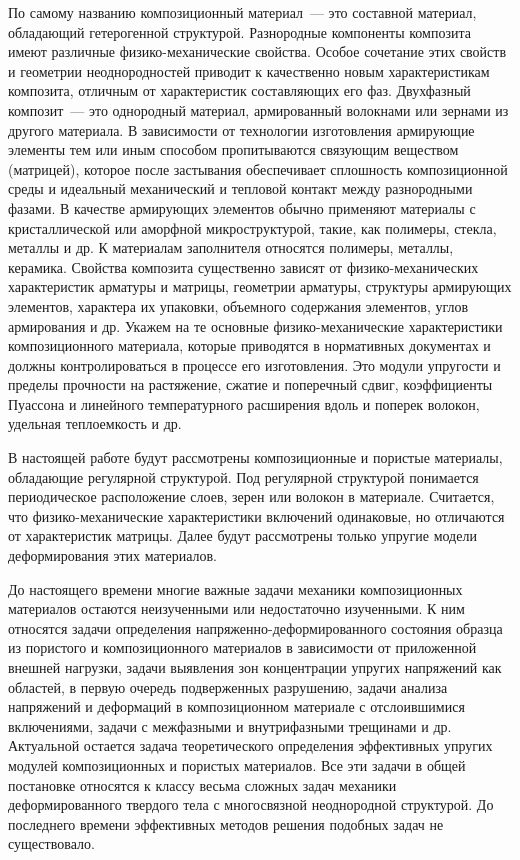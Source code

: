 По самому названию композиционный материал~--- это составной материал, обладающий гетерогенной структурой. Разнородные компоненты композита имеют различные физико-механические свойства. Особое сочетание этих свойств и геометрии неоднородностей приводит к качественно новым характеристикам композита, отличным от характеристик составляющих его фаз. Двухфазный композит~--- это однородный материал, армированный волокнами или зернами из другого материала. В зависимости от технологии изготовления армирующие элементы тем или иным способом пропитываются связующим веществом (матрицей), которое после застывания обеспечивает сплошность композиционной среды и идеальный механический и тепловой контакт между разнородными фазами. В качестве армирующих элементов обычно применяют материалы с кристаллической или аморфной микроструктурой, такие, как полимеры, стекла, металлы и др. К материалам заполнителя относятся полимеры, металлы, керамика. Свойства композита существенно зависят от физико-механических характеристик арматуры и матрицы, геометрии арматуры, структуры армирующих элементов, характера их упаковки, объемного содержания элементов, углов армирования и др. Укажем на те основные физико-механические характеристики композиционного материала, которые приводятся в нормативных документах и должны контролироваться в процессе его изготовления. Это модули упругости и пределы прочности на растяжение, сжатие и поперечный сдвиг, коэффициенты Пуассона и линейного температурного расширения вдоль и поперек волокон, удельная теплоемкость и др.{\sloppy\par}

В настоящей работе будут рассмотрены композиционные и пористые материалы, обладающие регулярной структурой. Под регулярной структурой понимается периодическое расположение слоев, зерен или волокон в материале. Считается, что фи\-зи\-ко-\-ме\-ха\-ни\-че\-ские характеристики включений одинаковые, но отличаются от характеристик матрицы. Далее будут рассмотрены только упругие модели деформирования этих материалов.

До настоящего времени многие важные задачи механики композиционных материалов остаются неизученными или недостаточно изученными. К ним относятся задачи определения напряженно-деформированного состояния образца из пористого и композиционного материалов в зависимости от приложенной внешней нагрузки, задачи выявления зон концентрации упругих напряжений как областей, в первую очередь подверженных разрушению, задачи анализа напряжений и деформаций в композиционном материале с отслоившимися включениями, задачи с межфазными и внутрифазными трещинами и др. Актуальной остается задача теоретического определения эффективных упругих модулей композиционных и пористых материалов. Все эти задачи в общей постановке относятся к классу весьма сложных задач механики деформированного твердого тела с многосвязной неоднородной структурой. До последнего времени эффективных методов решения подобных задач не существовало.

